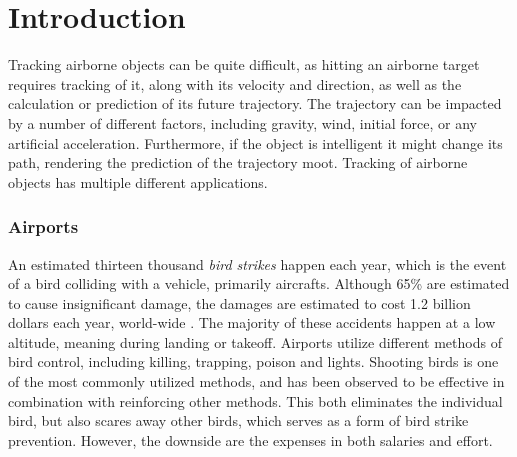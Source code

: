 
\chapter{Introduction}
Tracking airborne objects can be quite difficult, as hitting an airborne target requires tracking of it, along with its velocity and direction, as well as the calculation or prediction of its future trajectory.
The trajectory can be impacted by a number of different factors, including gravity, wind, initial force, or any artificial acceleration.
Furthermore, if the object is intelligent it might change its path, rendering the prediction of the trajectory moot.
Tracking of airborne objects has multiple different applications.

\subsection{Airports}
An estimated thirteen thousand \textit{bird strikes} happen each year, which is the event of a bird colliding with a vehicle, primarily aircrafts\cite{WildlifeStrikeReport}.
Although 65\% are estimated to cause insignificant damage, the damages are estimated to cost 1.2 billion dollars each year, world-wide \cite{CostOfBirdstrikes}.
The majority of these accidents happen at a low altitude, meaning during landing or takeoff\cite{CostOfBirdstrikes}.
Airports utilize different methods of bird control, including killing, trapping, poison and lights\cite{BirdControlAtAirports}.
Shooting birds is one of the most commonly utilized methods, and has been observed to be effective in combination with reinforcing other methods.
This both eliminates the individual bird, but also scares away other birds, which serves as a form of bird strike prevention.
However, the downside are the expenses in both salaries and effort.

